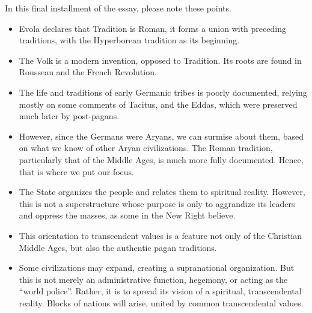 \begin{quotationx}
In this final installment of the essay, please note these points.

\begin{itemize}


\item Evola declares that Tradition is Roman, it forms a union with preceding traditions, with the Hyperborean tradition as its beginning.

\item The Volk is a modern invention, opposed to Tradition. Its roots are found in Rousseau and the French Revolution.

\item The life and traditions of early Germanic tribes is poorly documented, relying mostly on some comments of Tacitus, and the Eddas, which were preserved much later by post-pagans.

\item However, since the Germans were Aryans, we can surmise about them, based on what we know of other Aryan civilizations. The Roman tradition, particularly that of the Middle Ages, is much more fully documented. Hence, that is where we put our focus.

\item The State organizes the people and relates them to spiritual reality. However, this is not a superstructure whose purpose is only to aggrandize its leaders and oppress the masses, as some in the New Right believe.

\item This orientation to transcendent values is a feature not only of the Christian Middle Ages, but also the authentic pagan traditions.

\item Some civilizations may expand, creating a supranational organization. But this is not merely an administrative function, hegemony, or acting as the ``world police''. Rather, it is to spread its vision of a spiritual, transcendental reality. Blocks of nations will arise, united by common transcendental values.
\end{itemize}
\end{quotationx}


